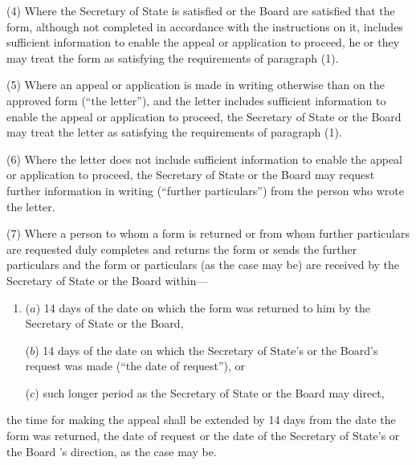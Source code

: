 \documentclass[12pt,a4paper]{article}
\begin{document}
(4) Where the Secretary of State is satisfied 
or the Board are satisfied   %
that the form, although not completed in accordance with the instructions on it, includes sufficient information to enable the appeal or application to proceed, he 
or they   %
may treat the form as satisfying the requirements of paragraph (1).

(5) Where an appeal or application is made in writing otherwise than on the approved form (“the letter”), and the letter includes sufficient information to enable the appeal or application to proceed, the Secretary of State 
or the Board   %
may treat the letter as satisfying the requirements of paragraph (1).

(6) Where the letter does not include sufficient information to enable the appeal or application to proceed, the Secretary of State 
or the Board   %
may request further information in writing (“further particulars”) from the person who wrote the letter.

(7) Where a person to whom a form is returned or from whom further particulars are requested duly completes and returns the form or sends the further particulars and the form or particulars (as the case may be) are received by the Secretary of State 
or the Board   %
within—
\begin{enumerate}\item[]
($a$) 14 days of the date on which the form was returned to him by the Secretary of State
or the Board,   %

($b$) 14 days of the date on which the Secretary of State’s 
or the Board's   %
request was made (“the date of request”), or

($c$) such longer period as the Secretary of State 
or the Board   %
may direct,
\end{enumerate}
the time for making the appeal shall be extended by 14 days from the date the form was returned, the date of request or the date of the Secretary of State’s 
or the Board 's  %
direction, as the case may be.
\end{document}
